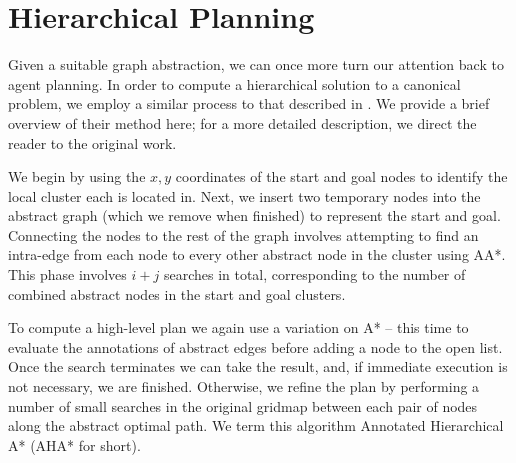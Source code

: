 \section{Hierarchical Planning}
Given a suitable graph abstraction, we can once more turn our attention back to agent planning. 
In order to compute a hierarchical solution to a canonical problem, we employ a similar process to that described in \cite{botea04}.
We provide a brief overview of their method here; for a more detailed description, we direct the reader to the original work.
\par \indent
We begin by using the $x,y$ coordinates of the start and goal  nodes to identify the local cluster each is located in. 
Next, we insert two temporary nodes into the abstract graph (which we remove when finished) to represent the start and goal.
Connecting the nodes to the rest of the graph involves attempting to find an intra-edge from each node to every other abstract node in the cluster using AA*. 
This phase involves $i+j$ searches in total, corresponding to the number of combined abstract nodes in the start and goal clusters.
\par \indent
To compute a high-level plan we again use a variation on A* -- this time to evaluate the annotations of abstract edges before adding a node to the open list.
Once the search terminates we can take the result, and, if immediate execution is not necessary, we are finished. 
Otherwise, we refine the plan by performing a number of small searches in the original gridmap between each pair of nodes along the abstract optimal path. 
We term this algorithm Annotated Hierarchical A* (AHA* for short).
